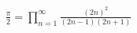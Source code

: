 \documentclass[preview]{standalone}
\begin{document}
\begin{align*}
\frac{\pi}{2} = \prod_{n=1}^{\infty} \frac{(2n)^2}{(2n-1)(2n+1)}
\end{align*}
\end{document}
